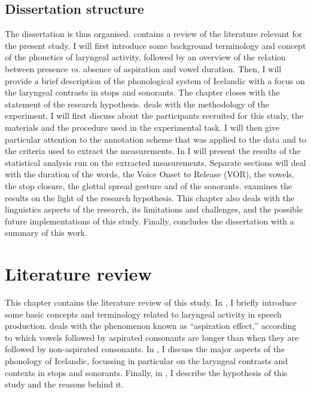 \documentclass[11pt,a4paper,openany]{memoir}\usepackage[]{graphicx}\usepackage[]{color}
\begin{document}
\section{Dissertation structure}
The dissertation is thus organised.
 contains a review of the literature relevant for the present study.
I will first introduce some background terminology and concept of the phonetics of laryngeal activity, followed by an overview of the relation between presence \textit{vs.} absence of aspiration and vowel duration.
Then, I will provide a brief description of the phonological system of Icelandic with a focus on the laryngeal contrasts in stops and sonorants.
The chapter closes with the statement of the research hypothesis.
 deals with the methodology of the experiment.
I will first discuss about the participants recruited for this study, the materials and the procedure used in the experimental task.
I will then give particular attention to the annotation scheme that was applied to the data and to the criteria used to extract the measurements.
In  I will present the results of the statistical analysis run on the extracted measurements.
Separate sections will deal with the duration of the words, the Voice Onset to Release (VOR), the vowels, the stop closure, the glottal spread gesture and of the sonorants.
 examines the results on the light of the research hypothesis.
This chapter also deals with the linguistics aspects of the research, its limitations and challenges, and the possible future implementations of this study.
Finally, concludes the dissertation with a summary of this work.







\chapter{Literature review}
\label{c:review}
This chapter contains the literature review of this study.
In , I briefly introduce some basic concepts and terminology related to laryngeal activity in speech production.
 deals with the phenomenon known as ``aspiration effect,'' according to which vowels followed by aspirated consonants are longer than when they are followed by non-aspirated consonants.
In , I discuss the major aspects of the phonology of Icelandic, focussing in particular on the laryngeal contrasts and contexts in stops and sonorants.
Finally, in , I describe the hypothesis of this study and the reasons behind it.
\end{document}

